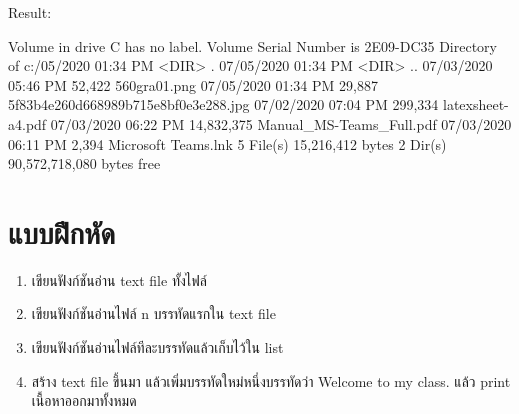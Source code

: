 Result:
\begin{pycode}
Volume in drive C has no label.
Volume Serial Number is 2E09-DC35
Directory of c:\users\janta{}/05/2020  01:34 PM    <DIR>          .
07/05/2020  01:34 PM    <DIR>          ..
07/03/2020  05:46 PM            52,422 560gra01.png
07/05/2020  01:34 PM            29,887 5f83b4e260d668989b715e8bf0e3e288.jpg
07/02/2020  07:04 PM           299,334 latexsheet-a4.pdf
07/03/2020  06:22 PM        14,832,375 Manual_MS-Teams_Full.pdf
07/03/2020  06:11 PM             2,394 Microsoft Teams.lnk
               5 File(s)     15,216,412 bytes
               2 Dir(s)  90,572,718,080 bytes free
\end{pycode}



\section{แบบฝึกหัด}
\begin{enumerate} 
\item 	เขียนฟังก์ชันอ่าน text file ทั้งไฟล์
\item 	เขียนฟังก์ชันอ่านไฟล์ n บรรทัดแรกใน text file
\item 	เขียนฟังก์ชันอ่านไฟล์ทีละบรรทัดแล้วเก็บไว้ใน list
\item 	สร้าง text file ขึ้นมา แล้วเพิ่มบรรทัดใหม่หนึ่งบรรทัดว่า Welcome to my class. แล้ว print เนื้อหาออกมาทั้งหมด
\end{enumerate}



